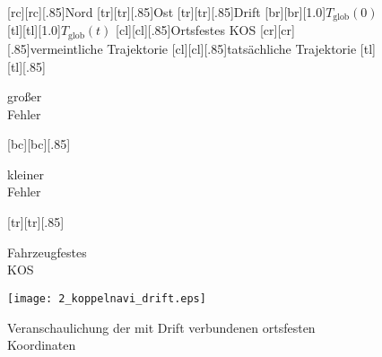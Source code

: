 \begin{figure}[h]
\newcommand{\smallsize}{.85}
[rc][rc][\smallsize]{Nord}
[tr][tr][\smallsize]{Ost}
[tr][tr][\smallsize]{Drift}
[br][br][1.0]{$T_\text{glob}(0)$}
[tl][tl][1.0]{$T_\text{glob}(t)$}
[cl][cl][\smallsize]{Ortsfestes KOS}
[cr][cr][\smallsize]{vermeintliche Trajektorie}
[cl][cl][\smallsize]{tatsächliche Trajektorie}
	[tl][tl][\smallsize]{\parbox[c]{7cm}{\begin{flushleft} großer \\ Fehler \end{flushleft}}}
		[bc][bc][\smallsize]{\parbox[c]{7cm}{\begin{center} kleiner \\ Fehler \end{center}}}
[tr][tr][\smallsize]{\parbox[c]{1cm}{\begin{centering} Fahrzeugfestes \\ KOS \end{centering}}}
\texttt{[image: 2\_koppelnavi\_drift.eps]}
 \caption[Mit Drift verbundene ortsfeste Koordinaten]{Veranschaulichung der mit Drift verbundenen ortsfesten Koordinaten}
 \label{fig:Odo_drift}
\end{figure} 

 

